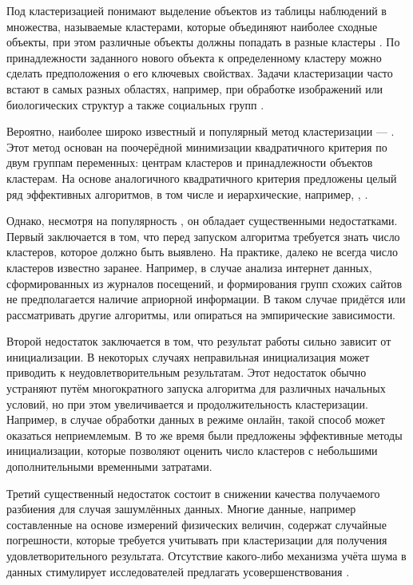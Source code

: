 \documentclass[12pt]{diploma}
\begin{document}
		Под кластеризацией понимают выделение объектов из таблицы наблюдений в множества, называемые кластерами, которые объединяют наиболее сходные объекты, при этом различные объекты должны попадать в разные кластеры \cite{mirkin-ds}. По принадлежности заданного нового объекта к определенному кластеру можно сделать предположения о его ключевых свойствах. Задачи кластеризации часто встают в самых разных областях, например, при обработке изображений или биологических структур а также социальных групп \cite{mirkin-clustering}.
		
		Вероятно, наиболее широко известный и популярный метод кластеризации --- \kmeans \cite{k-means-canonical}. Этот метод основан на поочерёдной минимизации квадратичного критерия по двум группам переменных: центрам кластеров и принадлежности объектов кластерам. На основе аналогичного квадратичного критерия предложены целый ряд эффективных алгоритмов, в том числе и иерархические, например, \Ward, \BisectingKmeans. 
		
		Однако, несмотря на популярность \kmeans, он обладает существенными недостатками. Первый заключается в том, что перед запуском алгоритма требуется знать число кластеров, которое должно быть выявлено. На практике, далеко не всегда число кластеров известно заранее. Например, в случае анализа интернет данных, сформированных из журналов посещений, и формирования групп схожих сайтов не предполагается наличие априорной информации. В таком случае придётся или рассматривать другие алгоритмы, или опираться на эмпирические зависимости.
		
		Второй недостаток заключается в том, что результат работы \kmeans сильно зависит от инициализации. В некоторых случаях неправильная инициализация может приводить к неудовлетворительным результатам. Этот недостаток обычно устраняют путём многократного запуска алгоритма для различных начальных условий, но при этом увеличивается и продолжительность кластеризации. Например, в случае обработки данных в режиме онлайн, такой способ может оказаться неприемлемым.  В то же время были предложены эффективные методы инициализации, которые позволяют оценить число кластеров с небольшими дополнительными временными затратами. 
		
		Третий существенный недостаток \kmeans состоит в снижении качества получаемого разбиения для случая зашумлённых данных. Многие данные, например составленные на основе измерений физических величин, содержат случайные погрешности, которые требуется учитывать при кластеризации для получения удовлетворительного результата. Отсутствие какого-либо механизма учёта шума в данных стимулирует исследователей предлагать усовершенствования \kmeans.
		
\end{document}
